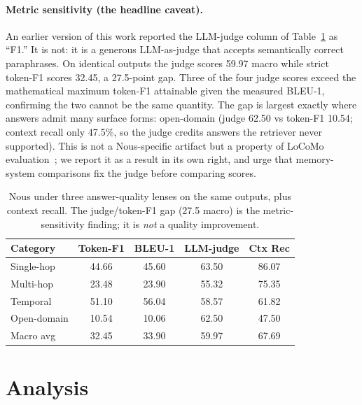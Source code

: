 \documentclass[11pt,a4paper,twocolumn]{article}
\begin{document}
\paragraph{Metric sensitivity (the headline caveat).}
An earlier version of this work reported the LLM-judge column of
Table~\ref{tab:metric} as ``F1.'' It is not: it is a generous LLM-as-judge that
accepts semantically correct paraphrases. On identical outputs the judge scores
59.97 macro while strict token-F1 scores 32.45, a 27.5-point gap. Three of the
four judge scores exceed the mathematical maximum token-F1 attainable given the
measured BLEU-1, confirming the two cannot be the same quantity. The gap is
largest exactly where answers admit many surface forms: open-domain
(judge 62.50 vs token-F1 10.54; context recall only 47.5\%, so the judge credits
answers the retriever never supported). This is not a Nous-specific artifact but
a property of LoCoMo evaluation~\citep{locomo2025audit}; we report it as a
result in its own right, and urge that memory-system comparisons fix the judge
before comparing scores.

\begin{table}[t]
\centering
\caption{Nous under three answer-quality lenses on the same outputs, plus
context recall. The judge/token-F1 gap (27.5 macro) is the metric-sensitivity
finding; it is \emph{not} a quality improvement.}
\label{tab:metric}
\renewcommand{\arraystretch}{1.25}
\setlength{\tabcolsep}{4pt}
\small
\begin{tabular}{lcccc}
\toprule
Category & Token-F1 & BLEU-1 & LLM-judge & Ctx Rec \\
\midrule
Single-hop  & 44.66 & 45.60 & 63.50 & 86.07 \\
Multi-hop   & 23.48 & 23.90 & 55.32 & 75.35 \\
Temporal    & 51.10 & 56.04 & 58.57 & 61.82 \\
Open-domain & 10.54 & 10.06 & 62.50 & 47.50 \\
\midrule
Macro avg   & 32.45 & 33.90 & 59.97 & 67.69 \\
\bottomrule
\end{tabular}
\end{table}

\section{Analysis}
\label{sec:analysis}
\end{document}
